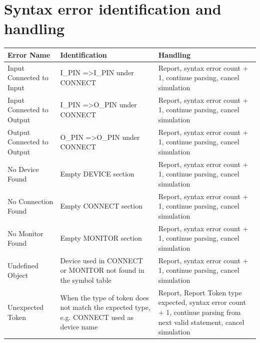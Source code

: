 \documentclass[12pt]{article}
\begin{document}
\section{Syntax error identification and handling}
\begin{center}
	\begin{tabular}{|m{3cm} | m{6cm} | m{8cm} |}
		\hline
		Error Name & Identification & Handling \\
		\hline
		Input Connected to Input & I\_PIN =\textgreater  I\_PIN under CONNECT &  Report, syntax error count + 1, continue parsing, cancel simulation \\
		\hline
		Input Connected to Output & I\_PIN =\textgreater  O\_PIN under CONNECT &  Report, syntax error count + 1, continue parsing, cancel simulation \\
		\hline
		Output Connected to Output & O\_PIN =\textgreater  O\_PIN under CONNECT &  Report, syntax error count + 1, continue parsing, cancel simulation \\
		\hline
		No Device Found & Empty DEVICE section & Report, syntax error count + 1, continue parsing, cancel simulation \\
		\hline
		No Connection Found & Empty CONNECT section & Report, syntax error count + 1, continue parsing, cancel simulation \\
		\hline
		No Monitor Found & Empty MONITOR section & Report, syntax error count + 1, continue parsing, cancel simulation \\
		\hline
		Undefined Object & Device used in CONNECT or MONITOR not found in the symbol table & Report, syntax error count + 1, continue parsing, cancel simulation \\
		\hline
		Unexpected Token & When the type of token does not match the expected type, e.g. CONNECT used as device name & Report, Report Token type expected,  syntax error count + 1, continue parsing from next valid statement, cancel simulation \\
		\hline
	
	\end{tabular}
\end{center}
\newpage
\end{document}
